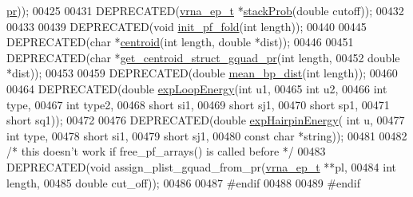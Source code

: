\begin{DoxyCode}
      \hyperlink{fold__vars_8h_ac98ec419070aee6831b44e5c700f090f}{pr}));
00425 
00431 DEPRECATED(\hyperlink{group__struct__utils_structvrna__elem__prob__s}{vrna\_ep\_t} *\hyperlink{part__func_8h_a8f18624bcd0b47d1a266d9e5527e5362}{stackProb}(\textcolor{keywordtype}{double} cutoff));
00432 
00433 
00439 DEPRECATED(\textcolor{keywordtype}{void} \hyperlink{part__func_8h_a15176e23eceeff8c7d14eabcfec8a2af}{init\_pf\_fold}(\textcolor{keywordtype}{int} length));
00440 
00445 DEPRECATED(\textcolor{keywordtype}{char} *\hyperlink{part__func_8h_ae89a63bd83e75a80b2ba36d20b31ce81}{centroid}(\textcolor{keywordtype}{int} length, \textcolor{keywordtype}{double} *dist));
00446 
00451 DEPRECATED(\textcolor{keywordtype}{char} *\hyperlink{part__func_8h_a4e99e951dfdc006fe56c3a59374378ed}{get\_centroid\_struct\_gquad\_pr}(\textcolor{keywordtype}{int} length,
00452                                   \textcolor{keywordtype}{double} *dist));
00453 
00459 DEPRECATED(\textcolor{keywordtype}{double} \hyperlink{part__func_8h_ae9556ba7ded44fe2321b6f67c3fc02a3}{mean\_bp\_dist}(\textcolor{keywordtype}{int} length));
00460 
00464 DEPRECATED(\textcolor{keywordtype}{double} \hyperlink{part__func_8h_a68ba6f3a48e08ca131ab54621ce3a2d7}{expLoopEnergy}(\textcolor{keywordtype}{int} u1,
00465                                 \textcolor{keywordtype}{int} u2,
00466                                 \textcolor{keywordtype}{int} type,
00467                                 \textcolor{keywordtype}{int} type2,
00468                                 \textcolor{keywordtype}{short} si1,
00469                                 \textcolor{keywordtype}{short} sj1,
00470                                 \textcolor{keywordtype}{short} sp1,
00471                                 \textcolor{keywordtype}{short} sq1));
00472 
00476 DEPRECATED(\textcolor{keywordtype}{double} \hyperlink{part__func_8h_a7b6ab474cc80accc48010ccfcc59f96b}{expHairpinEnergy}( \textcolor{keywordtype}{int} u,
00477                                     \textcolor{keywordtype}{int} type,
00478                                     \textcolor{keywordtype}{short} si1,
00479                                     \textcolor{keywordtype}{short} sj1,
00480                                     \textcolor{keyword}{const} \textcolor{keywordtype}{char} *\textcolor{keywordtype}{string}));
00481 
00482 \textcolor{comment}{/* this doesn't work if free\_pf\_arrays() is called before */}
00483 DEPRECATED(\textcolor{keywordtype}{void} assign\_plist\_gquad\_from\_pr(\hyperlink{group__struct__utils_structvrna__elem__prob__s}{vrna\_ep\_t} **pl,
00484                                 \textcolor{keywordtype}{int} length,
00485                                 \textcolor{keywordtype}{double} cut\_off));
00486 
00487 \textcolor{preprocessor}{#endif}
00488 
00489 \textcolor{preprocessor}{#endif}
\end{DoxyCode}
